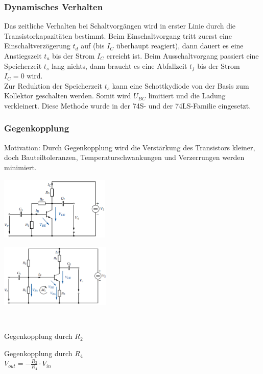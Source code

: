 		\subsubsection{Dynamisches Verhalten}
		Das zeitliche Verhalten bei Schaltvorgängen wird in erster Linie durch die
		Transistorkapazitäten bestimmt. Beim Einschaltvorgang tritt zuerst eine
		Einschaltverzögerung $t_d$ auf (bis $I_C$ überhaupt reagiert), dann dauert es
		eine Anstiegszeit $t_a$ bis der Strom $I_C$ erreicht ist. Beim Ausschaltvorgang
		passiert eine Speicherzeit $t_s$ lang nichts, dann braucht es eine Abfallzeit $t_f$
		bis der Strom $I_C=0$ wird.  \\
		Zur Reduktion der Speicherzeit $t_s$ kann eine Schottkydiode von der Basis zum 
		Kollektor geschalten werden. Somit wird $U_{BC}$ limitiert und die Ladung verkleinert.
		Diese Methode wurde in der 74S- und der 74LS-Familie eingesetzt. \\
\newpage		
        \subsubsection{Gegenkopplung}
        Motivation: Durch Gegenkopplung wird die Verstärkung des Transistors kleiner, doch
        Bauteiltoleranzen, Temperaturschwankungen und Verzerrungen werden minimiert. \\
            \begin{minipage}[T]{5.5cm}
                \includegraphics[height=3cm]{./images/Spannungsgegenkopplung.png}
            \end{minipage}
            \begin{minipage}[T]{5.5cm}
                \includegraphics[height=3cm]{./images/Stromgegenkopplung.png}
            \end{minipage} \\
            \begin{minipage}[T]{5.5cm}
                Gegenkopplung durch $R_2$
            \end{minipage}
            \begin{minipage}[T]{5.5cm}
                Gegenkopplung durch $R_4$\\
                $V_{out} = -\frac{R_3}{R_4}\cdot V_{in}$\\
            \end{minipage}
            

